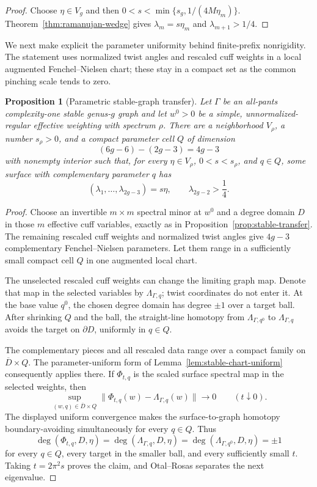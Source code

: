 \documentclass[11pt,reqno]{amsart}
\newtheorem{proposition}[theorem]{Proposition}
\theoremstyle{definition}
\theoremstyle{remark}
\begin{document}
\begin{proof}
Choose $\eta\in V_g$ and then
$0<s<\min\{s_g,1/(4M\eta_m)\}$.  Theorem~\ref{thm:ramanujan-wedge} gives
$\lambda_m=s\eta_m$ and $\lambda_{m+1}>1/4$.
\end{proof}

We next make explicit the parameter uniformity behind finite-prefix
nonrigidity.  The statement uses normalized twist angles and rescaled cuff
weights in a local augmented Fenchel--Nielsen chart; these stay in a compact
set as the common pinching scale tends to zero.

\begin{proposition}[Parametric stable-graph transfer]
\label{prop:parametric-transfer}
Let $\Gamma$ be an all-pants complexity-one stable genus-$g$ graph and let
$w^0>0$
be a simple, unnormalized-regular effective weighting with spectrum $\rho$.
There are a neighborhood $V_\rho$, a number $s_\rho>0$, and a compact
parameter cell $Q$ of dimension
\[
 (6g-6)-(2g-3)=4g-3
\]
with nonempty interior such that, for every $\eta\in V_\rho$,
$0<s<s_\rho$, and $q\in Q$, some surface with complementary parameter $q$
has
\[
 (\lambda_1,\ldots,\lambda_{2g-3})=s\eta,
 \qquad \lambda_{2g-2}>\frac14.
\]
\end{proposition}

\begin{proof}
Choose an invertible $m\times m$ spectral minor at $w^0$ and a degree domain
$D$ in those $m$ effective cuff variables, exactly as in
Proposition~\ref{prop:stable-transfer}.  The remaining rescaled cuff
weights and normalized twist angles give $4g-3$ complementary
Fenchel--Nielsen parameters.  Let them range in a sufficiently small compact
cell $Q$ in one augmented local chart.

The unselected rescaled cuff weights can change the limiting graph map.
Denote that map in the selected variables by $\Lambda_{\Gamma,q}$; twist
coordinates do not enter it.  At the base value $q^0$, the chosen degree
domain has degree $\pm1$ over a target ball.  After shrinking $Q$ and the
ball, the straight-line homotopy from $\Lambda_{\Gamma,q^0}$ to
$\Lambda_{\Gamma,q}$ avoids the target on $\partial D$, uniformly in
$q\in Q$.

The complementary pieces and all rescaled data range over a compact family
on $\overline D\times Q$.  The parameter-uniform form of
Lemma~\ref{lem:stable-chart-uniform} consequently applies there.  If
$\Phi_{t,q}$ is the scaled surface spectral map in the selected weights,
then
\[
 \sup_{(w,q)\in\overline D\times Q}
 \|\Phi_{t,q}(w)-\Lambda_{\Gamma,q}(w)\|\longrightarrow0
 \qquad(t\downarrow0).
\]
The displayed uniform convergence makes the surface-to-graph homotopy
boundary-avoiding simultaneously for every $q\in Q$.  Thus
\[
 \deg(\Phi_{t,q},D,\eta)
 =\deg(\Lambda_{\Gamma,q},D,\eta)
 =\deg(\Lambda_{\Gamma,q^0},D,\eta)=\pm1
\]
for every $q\in Q$, every target in the smaller ball, and every sufficiently
small $t$.  Taking $t=2\pi^2s$ proves the claim, and Otal--Rosas separates
the next eigenvalue.
\end{proof}
\end{document}
